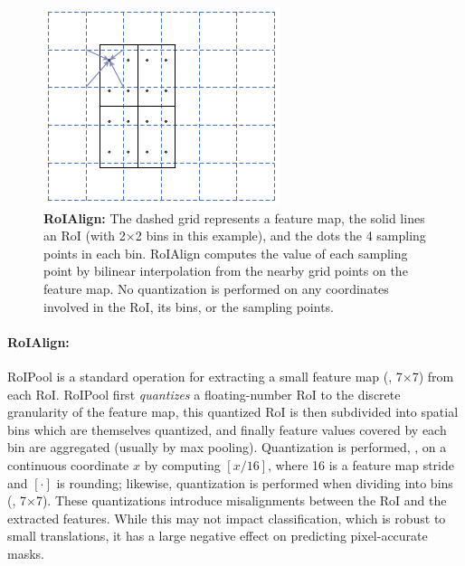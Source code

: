 \documentclass[10pt,twocolumn,letterpaper]{article}
\def\x{\times}
\begin{document}
\begin{figure}[t]
\begin{minipage}[c]{0.365\linewidth}
\includegraphics[width=\textwidth,trim={0 0 7.5mm 0},clip]{ai/roialign}
\end{minipage}\hfill
\begin{minipage}[c]{0.605\linewidth}
\caption{\footnotesize \textbf{RoIAlign:} The dashed grid represents a feature map, the solid lines an RoI (with 2$\times$2 bins in this example), and the dots the 4 sampling points in each bin. RoIAlign computes the value of each sampling point by bilinear interpolation from the nearby grid points on the feature map. No quantization is performed on any coordinates involved in the RoI, its bins, or the sampling points.}
\label{fig:roialign}
\end{minipage}\vspace{-5mm}
\end{figure}

\paragraph{RoIAlign:} RoIPool \cite{Girshick2015a} is a standard operation for extracting a small feature map (\eg, 7$\x$7) from each RoI. RoIPool first \emph{quantizes} a floating-number RoI to the discrete granularity of the feature map, this quantized RoI is then subdivided into spatial bins which are themselves quantized, and finally feature values covered by each bin are aggregated (usually by max pooling). Quantization is performed, \eg, on a continuous coordinate $x$ by computing $[x/16]$, where 16 is a feature map stride and $[\cdot]$ is rounding; likewise, quantization is performed when dividing into bins (\eg, 7$\x$7). These quantizations introduce misalignments between the RoI and the extracted features. While this may not impact classification, which is robust to small translations, it has a large negative effect on predicting pixel-accurate masks.
\end{document}
